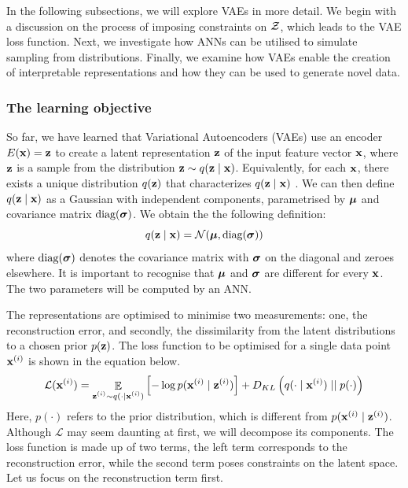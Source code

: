 In the following subsections, we will explore VAEs in more detail. We begin with a discussion on the process of imposing constraints on $\mathcal{Z}$, which leads to the VAE loss function. Next, we investigate how ANNs can be utilised to simulate sampling from distributions. Finally, we examine how VAEs enable the creation of interpretable representations and how they can be used to generate novel data.




\subsubsection{The learning objective}	

	So far, we have learned that Variational Autoencoders (VAEs) use an encoder $E(\mathbf{x}) = \mathbf{z}$ to create a latent representation $\mathbf{z}$ of the input feature vector $\mathbf{x}$, where $\mathbf{z}$ is a sample from the distribution $\mathbf{z} \sim q (\mathbf{z} \mid \mathbf{x})$. Equivalently, for each $\mathbf{x}$, there exists a unique distribution $q(\mathbf{z})$ that characterizes $q (\mathbf{z} \mid \mathbf{x})$ \cite{volodymyrkuleshovVariationalAutoencoder2023}. We can then define $q (\mathbf{z} \mid \mathbf{x})$ as a Gaussian with independent components, parametrised by $\bm{\mu}$ and covariance matrix $\text{diag}(\bm{\sigma})$. We obtain the the following definition:
	\begin{equation}
		q (\mathbf{z} \mid \mathbf{x}) = \mathcal{N}(\bm{\mu} , \text{diag}(\bm{\sigma})) \label{eq:definition_q}
	\end{equation}
	where $\text{diag}(\bm{\sigma})$ denotes the covariance matrix with $\bm{\sigma}$ on the diagonal and zeroes elsewhere. It is important to recognise that $\bm{\mu}$ and $\bm{\sigma}$ are different for every $\mathbf{x}$. The two parameters will be computed by an ANN.


	The representations are optimised to minimise two measurements: one, the reconstruction error, and secondly, the dissimilarity from the latent distributions to a chosen prior $p(\mathbf{z})$. %
	The loss function to be optimised for a single data point $\mathbf{x}^{(i)}$ is shown in the equation below.
	\begin{equation}
		\mathcal{L} (\mathbf{x}^{(i)}) = \mathop{\mathbb{E}}_{\substack{\mathbf{z}^{(i)} \sim q (\cdot \mid \mathbf{x}^{(i)})}} \left[ -\log p (\mathbf{x}^{(i)} \mid \mathbf{z}^{(i)}) \right] + D_{KL} \left(  q (\cdot \mid \mathbf{x}^{(i)})  \mid \mid  p(\cdot)  \right) \label{eq:elbo_explicit_intial}
	\end{equation} %
	Here, $p(\cdot)$ refers to the prior distribution, which is different from $p (\mathbf{x}^{(i)} \mid \mathbf{z}^{(i)})$.
	Although $\mathcal{L}$ may seem daunting at first, we will decompose its components. The loss function is made up of two terms, the left term corresponds to the reconstruction error, while the second term poses constraints on the latent space. Let us focus on the reconstruction term first.
	
